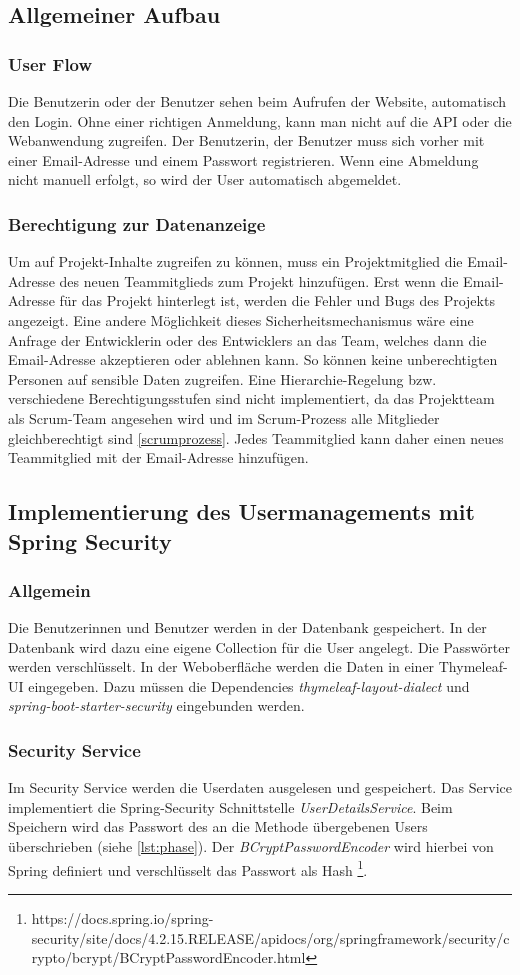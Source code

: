 \subsection{Allgemeiner Aufbau} 
\subsubsection{User Flow}
Die Benutzerin oder der Benutzer sehen beim Aufrufen der Website, automatisch den Login. Ohne einer richtigen Anmeldung, kann man nicht auf die API oder die Webanwendung zugreifen. Der Benutzerin, der Benutzer muss sich vorher mit einer Email-Adresse und einem Passwort registrieren. Wenn eine Abmeldung nicht manuell erfolgt, so wird der User automatisch abgemeldet.
\subsubsection{Berechtigung zur Datenanzeige}
Um auf Projekt-Inhalte zugreifen zu können, muss ein Projektmitglied die Email-Adresse des neuen Teammitglieds zum Projekt hinzufügen. Erst wenn die Email-Adresse für das Projekt hinterlegt ist, werden die Fehler und Bugs des Projekts angezeigt. Eine andere Möglichkeit dieses Sicherheitsmechanismus wäre eine Anfrage der Entwicklerin oder des Entwicklers an das Team, welches dann die Email-Adresse akzeptieren oder ablehnen kann. So können keine unberechtigten Personen auf sensible Daten zugreifen. Eine Hierarchie-Regelung bzw. verschiedene Berechtigungsstufen sind nicht implementiert, da das Projektteam als Scrum-Team angesehen wird und im Scrum-Prozess alle Mitglieder gleichberechtigt sind \ref{scrumprozess}. Jedes Teammitglied kann daher einen neues Teammitglied mit der Email-Adresse hinzufügen.

\subsection{Implementierung des Usermanagements mit Spring Security}
\subsubsection{Allgemein}
Die Benutzerinnen und Benutzer werden in der Datenbank gespeichert. In der Datenbank wird dazu eine eigene Collection für die User angelegt. Die Passwörter werden verschlüsselt. In der Weboberfläche werden die Daten in einer Thymeleaf-UI eingegeben. Dazu müssen die Dependencies \textit{thymeleaf-layout-dialect} und \textit{spring-boot-starter-security} eingebunden werden. 
\subsubsection{Security Service}   
Im Security Service werden die Userdaten ausgelesen und gespeichert. Das Service implementiert die Spring-Security Schnittstelle \textit{UserDetailsService}. Beim Speichern wird das Passwort des an die Methode übergebenen Users überschrieben (siehe \ref{lst:phase}). Der \textit{BCryptPasswordEncoder} wird hierbei von Spring definiert und verschlüsselt das Passwort als Hash \footnote{https://docs.spring.io/spring-security/site/docs/4.2.15.RELEASE/apidocs/org/springframework/security/crypto/bcrypt/BCryptPasswordEncoder.html}. 

